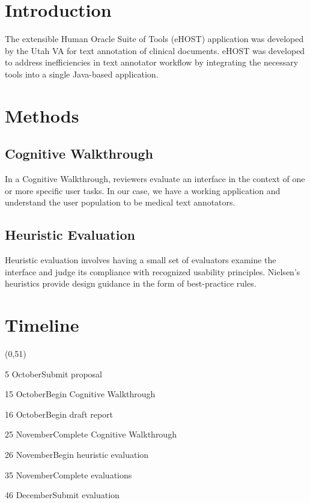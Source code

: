 \documentclass[11pt]{article}
\begin{document}
\section{Introduction}
The extensible Human Oracle Suite of Tools (eHOST) application was developed by the Utah VA for text annotation of clinical documents. eHOST was developed to address inefficiencies in text annotator workflow by integrating the necessary tools into a single Java-based application.

\section{Methods}

\subsection{Cognitive Walkthrough}

In a Cognitive Walkthrough, reviewers evaluate an interface in the context of one or more specific user tasks. In our case, we have a working application and understand the user population to be medical text annotators. 

\subsection{Heuristic Evaluation}

Heuristic evaluation involves having a small set of evaluators examine the interface and judge its compliance with recognized usability principles. Nielsen's heuristics provide design guidance in the form of best-practice rules.

\section{Timeline}
\begin{timeline}{2in}(0,51)
\optrule
  \item[5]{October}{Submit proposal}
  \item[15]{October}{Begin Cognitive Walkthrough}
  \item[16]{October}{Begin draft report}
  \item[25]{November}{Complete Cognitive Walkthrough}
  \item[26]{November}{Begin heuristic evaluation}
  \item[35]{November}{Complete evaluations}
  \item[46]{December}{Submit evaluation}
\end{timeline}
\end{document}
